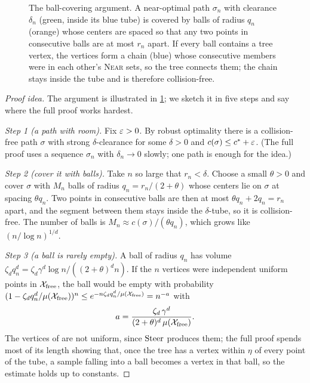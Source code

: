 \begin{figure}[tb]
  \centering
  \caption{The ball-covering argument. A near-optimal path $\sigma_n$
  with clearance $\delta_n$ (green, inside its blue tube) is covered by
  balls of radius $q_n$ (orange) whose centers are spaced so that any two
  points in consecutive balls are at most $r_n$ apart. If every ball
  contains a tree vertex, the vertices form a chain (blue) whose consecutive
  members were in each other's \textsc{Near} sets, so the tree connects
  them; the chain stays inside the tube and is therefore collision-free.}
  \label{fig:ch17-ball-covering}
\end{figure}

\begin{proof}[Proof idea]
The argument is illustrated in \cref{fig:ch17-ball-covering}; we sketch it
in five steps and say where the full proof works hardest.

\emph{Step 1 (a path with room).} Fix $\varepsilon>0$. By robust optimality there
is a collision-free path $\sigma$ with strong $\delta$-clearance for some
$\delta>0$ and $c(\sigma)\le c^*+\varepsilon$. (The full proof uses a sequence
$\sigma_n$ with $\delta_n\to0$ slowly; one path is enough for the idea.)

\emph{Step 2 (cover it with balls).} Take $n$ so large that $r_n<\delta$.
Choose a small $\theta>0$ and cover $\sigma$ with $M_n$ balls of radius
$q_n=r_n/(2+\theta)$ whose centers lie on $\sigma$ at spacing
$\theta q_n$. Two points in consecutive balls are then at most
$\theta q_n+2q_n=r_n$ apart, and the segment between them stays inside the
$\delta$-tube, so it is collision-free. The number of balls is
$M_n\approx c(\sigma)/(\theta q_n)$, which grows like $(n/\log n)^{1/d}$.

\emph{Step 3 (a ball is rarely empty).} A ball of radius $q_n$ has volume
$\zeta_dq_n^d=\zeta_d\gamma^d\log n/((2+\theta)^dn)$. If the $n$ vertices
were independent uniform points in $\mathcal{X}_{\mathrm{free}}$, the ball would be empty with
probability $(1-\zeta_dq_n^d/\mu(\mathcal{X}_{\mathrm{free}}))^n\le e^{-n\zeta_dq_n^d/\mu(\mathcal{X}_{\mathrm{free}})}=n^{-a}$
with
\[
  a=\frac{\zeta_d\,\gamma^d}{(2+\theta)^d\,\mu(\mathcal{X}_{\mathrm{free}})}.
\]
The vertices of \rrtstar are not uniform, since $\operatorname{Steer}$ produces them; the
full proof spends most of its length showing that, once the tree has a
vertex within $\eta$ of every point of the tube, a sample falling into a
ball becomes a vertex in that ball, so the estimate holds up to constants.


\end{proof}
